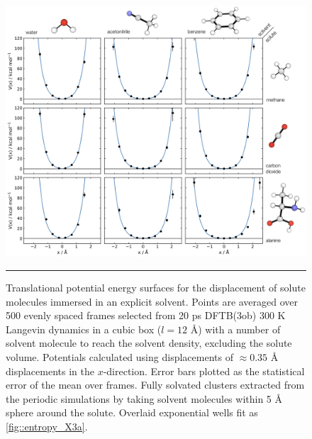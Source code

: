\documentclass[../main.tex]{subfiles}
\begin{document}
\vspace{0.2cm}
\begin{figure}[p!]
	\centering
	\includegraphics[width=\textwidth]{4/figs/figX5/figX5.png}
	\vspace{0.2cm}
	\hrule
	\caption{Translational potential energy surfaces for the displacement of solute molecules immersed in an explicit solvent. Points are averaged over 500 evenly spaced frames selected from 20 ps DFTB(3ob) 300 K Langevin dynamics in a cubic box ($l = 12$ \AA) with a number of solvent molecule to reach the solvent density, excluding the solute volume. Potentials calculated using displacements of $\approx 0.35$ \AA$\,$ displacements in the $x$-direction. Error bars plotted as the statistical error of the mean over frames. Fully solvated clusters extracted from the periodic simulations by taking solvent molecules within 5 \AA$\;$ sphere around the solute. Overlaid exponential wells fit as \figurename{ \ref{fig::entropy_X3a}}.}
	\label{fig::entropy_X5}
\end{figure}

\end{document}
